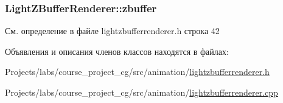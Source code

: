 \subsubsection[{\texorpdfstring{zbuffer}{zbuffer}}]{ Light\+Z\+Buffer\+Renderer\+::zbuffer\hspace{0.3cm}{\ttfamily [protected]}}\hypertarget{class_light_z_buffer_renderer_ad2acd2dd6506b9847a5ab10405b3a856}{}\label{class_light_z_buffer_renderer_ad2acd2dd6506b9847a5ab10405b3a856}


См. определение в файле lightzbufferrenderer.\+h строка 42



Объявления и описания членов классов находятся в файлах\+:\begin{DoxyCompactItemize}
\item 
Projects/labs/course\+\_\+project\+\_\+cg/src/animation/\hyperlink{lightzbufferrenderer_8h}{lightzbufferrenderer.\+h}\item 
Projects/labs/course\+\_\+project\+\_\+cg/src/animation/\hyperlink{lightzbufferrenderer_8cpp}{lightzbufferrenderer.\+cpp}\end{DoxyCompactItemize}
